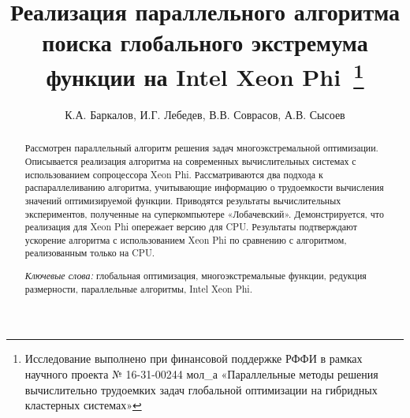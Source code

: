 \documentclass[a4paper]{article}
\begin{document}
\title{Реализация параллельного алгоритма поиска глобального экстремума функции на Intel Xeon Phi\
\footnote{
Исследование выполнено при финансовой поддержке РФФИ в рамках научного проекта № 16-31-00244 мол\_а «Параллельные методы решения вычислительно трудоемких задач глобальной оптимизации на гибридных кластерных системах»}}
\author{К.А. Баркалов, И.Г. Лебедев, В.В. Соврасов, А.В. Сысоев}
\date{}
\maketitle

\begin{abstract}
Рассмотрен параллельный алгоритм решения задач многоэкстремальной оптимизации. Описывается реализация алгоритма на современных вычислительных системах с использованием сопроцессора Xeon Phi. Рассматриваются два подхода к распараллеливанию алгоритма, учитывающие информацию о трудоемкости вычисления значений оптимизируемой функции. Приводятся результаты вычислительных экспериментов, полученные на суперкомпьютере «Лобачевский». Демонстрируется, что реализация для Xeon Phi опережает версию для CPU. Результаты подтверждают ускорение алгоритма с использованием Xeon Phi по сравнению с алгоритмом, реализованным только на CPU.
\par
\textit{Ключевые слова:} глобальная оптимизация, многоэкстремальные функции, редукция размерности, параллельные алгоритмы, Intel Xeon Phi.
\end{abstract}
\end{document}
